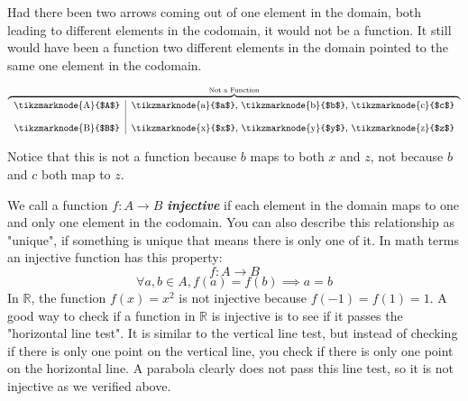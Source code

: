 \documentclass{report}
\begin{document}
Had there been two arrows coming out of one element in the domain, both leading to different elements in the codomain, it would not be a function.
It still would have been a function two different elements in the domain pointed to the same one element in the codomain.

\begin{center}

        $$\overbrace{
        \begin{tabular}{c| c}
            \tikzmarknode{A}{$A$} & \tikzmarknode{a}{$a$}, \tikzmarknode{b}{$b$}, \tikzmarknode{c}{$c$} \\
            \\
            \tikzmarknode{B}{$B$} & \tikzmarknode{x}{$x$}, \tikzmarknode{y}{$y$}, \tikzmarknode{z}{$z$} \\
        \end{tabular}
        }^{\text{Not a Function}}$$
\end{center}
Notice that this is not a function because $b$ maps to both $x$ and $z$, not because $b$ and $c$ both map to $z$.

We call a function $f: A \to B$ \textbf{\textit{injective}} if each element in the domain maps to one and only one element in the codomain.
You can also describe this relationship as "unique", if something is unique that means there is only one of it.
In math terms an injective function has this property: $$f: A \to B$$ $$\forall a, b \in A, f(a) = f(b) \implies a = b$$
In $\mathbb{R}$, the function $f(x) = x^2$ is not injective because $f(-1) = f(1) = 1$.
A good way to check if a function in $\mathbb{R}$ is injective is to see if it passes the "horizontal line test".
It is similar to the vertical line test, but instead of checking if there is only one point on the vertical line, you check if there is only one point on the horizontal line.
A parabola clearly does not pass this line test, so it is not injective as we verified above.
\end{document}
